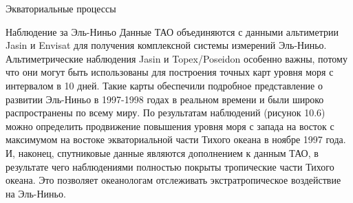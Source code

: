 \begin{chapter}{Экваториальные процессы}
\begin{section}{Наблюдение за Эль-Ниньо}
Данные ТАО объединяются с данными альтиметрии Jasin и Envisat для
получения комплексной системы измерений Эль-Ниньо. Альтиметрические
наблюдения Jasin и Topex/Poseidon особенно важны, потому что они могут
быть использованы для построения точных карт уровня моря с интервалом
в 10 дней. Такие карты обеспечили подробное представление о развитии
Эль-Ниньо в 1997-1998 годах в реальном времени и были широко
распространены по всему миру. По результатам наблюдений (рисунок 10.6)
можно определить продвижение повышения уровня моря с запада на восток
с максимумом на востоке экваториальной части Тихого океана в ноябре
1997 года. И, наконец, спутниковые данные являются дополнением к
данным ТАО, в результате чего наблюдениями полностью покрыты
тропические части Тихого океана. Это позволяет океанологам отслеживать
экстратропическое воздействие на Эль-Ниньо.
%


\end{section}
\end{chapter}
